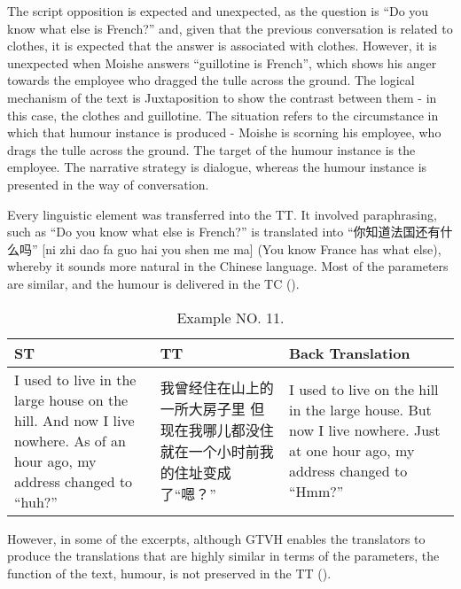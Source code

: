 \documentclass[english]{textolivre}
\begin{document}
The script opposition is expected and unexpected, as the question is “Do you know what else is French?” and, given that the previous conversation is related to clothes, it is expected that the answer is associated with clothes. However, it is unexpected when Moishe answers “guillotine is French”, which shows his anger towards the employee who dragged the tulle across the ground. The logical mechanism of the text is Juxtaposition to show the contrast between them - in this case, the clothes and guillotine. The situation refers to the circumstance in which that humour instance is produced - Moishe is scorning his employee, who drags the tulle across the ground. The target of the humour instance is the employee. The narrative strategy is dialogue, whereas the humour instance is presented in the way of conversation. 

Every linguistic element was transferred into the TT. It involved paraphrasing, such as “Do you know what else is French?” is translated into “你知道法国还有什么吗” [ni zhi dao fa guo hai you shen me ma] (You know France has what else), whereby it sounds more natural in the Chinese language. Most of the parameters are similar, and the humour is delivered in the TC ().  

\begin{table}[htpb]
\caption{Example NO. 11.}
\label{tbl11}
\begin{tabularx}{\linewidth}{XXX}
\toprule 
ST  & TT & Back Translation \\ 
\midrule
I used to live in the large house on the hill. 
And now I live nowhere. As of an hour ago, my address changed to “huh?”  & 我曾经住在山上的一所大房子里 
但现在我哪儿都没住 
就在一个小时前我的住址变成了“嗯？”  & I used to live on the hill in the large house. 
But now I live nowhere. 
Just at one hour ago, my address changed to “Hmm?” \\ 
\bottomrule
\end{tabularx}
\end{table}

However, in some of the excerpts, although GTVH enables the translators to produce the translations that are highly similar in terms of the parameters, the function of the text, humour, is not preserved in the TT (). 
\end{document}
